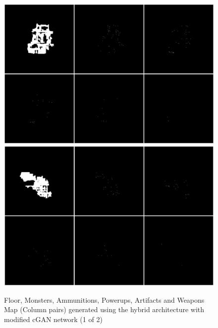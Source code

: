 \documentclass{Configuration_Files/PoliMi3i_thesis}
\begin{document}
\begin{figure}[H]
    \centering
    \includegraphics[width=1\textwidth]{mod_cgan_sample1.jpg}
    \includegraphics[width=1\textwidth]{mod_cgan_sample2.jpg}
    \caption[Samples generated using the modified cGAN network (1 of 2)]{Floor, Monsters, Ammunitions, Powerups, Artifacts and Weapons Map 
(Column pairs) generated using the hybrid architecture with modified cGAN network (1 of 2)}
    \label{fig:modcgansample1}
\end{figure}
\end{document}
